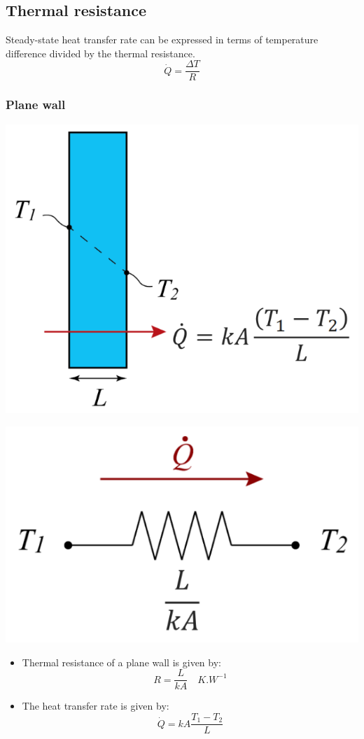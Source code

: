 \documentclass[11pt]{article}
\begin{document}
\subsection{Thermal resistance}
\label{sec:org907c19b}
Steady-state heat transfer rate can be expressed in terms of temperature difference divided by the thermal resistance.
\[\dot{Q} = \frac{\Delta T}{R}\]
\subsubsection{Plane wall}
\label{sec:org3d0f73f}
\begin{center}
\includegraphics[scale=0.8]{./images/thermal-resistance-plane-wall.png}
\end{center}
\begin{center}
\includegraphics[scale=0.8]{./images/thermal-resistance-plane-wall-electrical-analogy.png}
\end{center}
\begin{itemize}
\item Thermal resistance of a plane wall is given by:
\[R = \frac{L}{kA} \quad \unit{K.W^{-1}}\]
\item The heat transfer rate is given by:
\[\dot{Q} = kA \frac{T_1 - T_2}{L}\]
\end{itemize}
\end{document}
